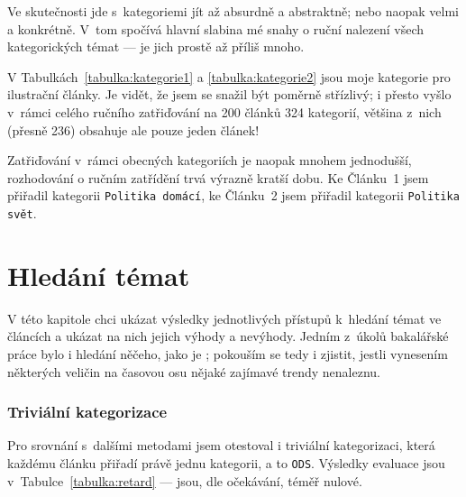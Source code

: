 \documentclass[12pt,a4paper]{report}
\begin{document}
Ve skutečnosti jde s~kategoriemi jít až absurdně  a abstraktně; nebo naopak velmi  a konkrétně. V~tom spočívá hlavní slabina mé snahy o ruční nalezení všech kategorických témat --- je jich prostě až příliš mnoho.

V Tabulkách~\ref{tabulka:kategorie1} a \ref{tabulka:kategorie2} jsou moje kategorie pro ilustrační články. Je vidět, že jsem se snažil být poměrně střízlivý; i přesto vyšlo v~rámci celého ručního zatřiďování na 200 článků 324 kategorií, většina z~nich (přesně 236) obsahuje ale pouze jeden článek!

Zatřiďování v~rámci obecných kategoriích je naopak mnohem jednodušší, roz\-ho\-do\-vá\-ní o ručním zatřídění trvá výrazně kratší dobu. Ke Článku~1 jsem přiřadil kategorii \texttt{Politika domácí}, ke Článku~2 jsem přiřadil kategorii \texttt{Politika svět}.

\section{Hledání témat}
\label{sec:hledanitemat_prezentace_vysledku}

V této kapitole chci ukázat výsledky jednotlivých přístupů k~hledání témat ve článcích a ukázat na nich jejich výhody a nevýhody. Jedním z~úkolů bakalářské práce bylo i hledání něčeho, jako je ; pokouším se tedy i zjistit, jestli vynesením některých veličin na časovou osu nějaké zajímavé trendy nenaleznu.


\subsubsection{Triviální kategorizace}



Pro srovnání s~dalšími metodami jsem otestoval i triviální kategorizaci, která každému článku přiřadí právě jednu kategorii, a to \texttt{ODS}. Výsledky evaluace jsou v~Tabulce~\ref{tabulka:retard} --- jsou, dle očekávání, téměř nulové.
\end{document}
